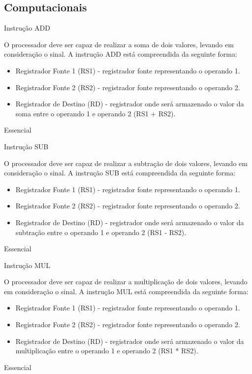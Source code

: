 \documentclass{article}
\begin{document}
    \subsection{Computacionais}
    \begin{functional}

     \requirement
      {Instrução ADD}
      {O processador deve ser capaz de realizar a soma de dois valores, levando em consideração o sinal.
      A instrução ADD está compreendida da seguinte forma:\\
       \begin{itemize}
        \item Registrador Fonte 1 (RS1) - registrador fonte representando o operando 1.
        \item Registrador Fonte 2 (RS2) - registrador fonte representando o operando 2.
        \item Registrador de Destino (RD) - registrador onde será armazenado o valor da soma entre o operando 1 e operando 2 (RS1 + RS2).
       \end{itemize}
       }
      {Essencial}

     \requirement
      {Instrução SUB}
      {O processador deve ser capaz de realizar a subtração de dois valores, levando em consideração o sinal.
      A instrução SUB está compreendida da seguinte forma:\\
       \begin{itemize}
        \item Registrador Fonte 1 (RS1) - registrador fonte representando o operando 1.
        \item Registrador Fonte 2 (RS2) - registrador fonte representando o operando 2.
        \item Registrador de Destino (RD) - registrador onde será armazenado o valor da subtração entre o operando 1 e operando 2 (RS1 - RS2).
       \end{itemize}
       }
      {Essencial}

      \requirement
      {Instrução MUL}
      {O processador deve ser capaz de realizar a multiplicação de dois valores, levando em consideração o sinal.
      A instrução MUL está compreendida da seguinte forma:\\
       \begin{itemize}
        \item Registrador Fonte 1 (RS1) - registrador fonte representando o operando 1.
        \item Registrador Fonte 2 (RS2) - registrador fonte representando o operando 2.
        \item Registrador de Destino (RD) - registrador onde será armazenado o valor da multiplicação entre o operando 1 e operando 2 (RS1 * RS2).
       \end{itemize}
       }
      {Essencial}


\end{functional}
\end{document}
